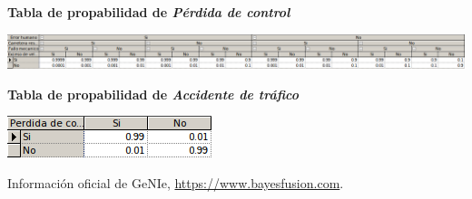 \documentclass{article}
\begin{document}
\textbf{Tabla de propabilidad de \textit{Pérdida de control}}

\begin{flushleft}
\includegraphics[scale=0.35]{Control.png}
\end{flushleft}

\textbf{Tabla de propabilidad de \textit{Accidente de tráfico}}

\begin{center}
\includegraphics[scale=0.5]{Accidente.png}
\end{center}

\begin{thebibliography}{9}
 Información oficial de GeNIe, \url{https://www.bayesfusion.com}.
\end{thebibliography}
\end{document}
